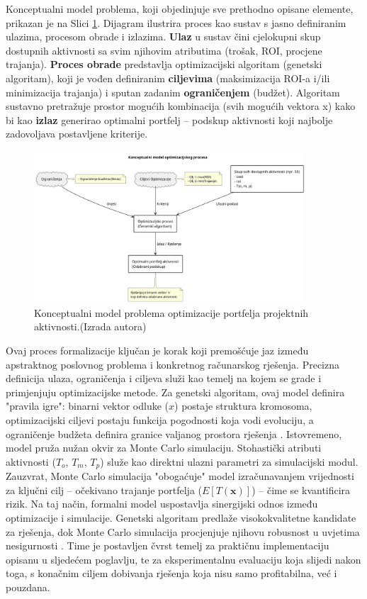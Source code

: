 Konceptualni model problema, koji objedinjuje sve prethodno opisane elemente, prikazan je na Slici \ref{fig:konceptualni_model}. Dijagram ilustrira proces kao sustav s jasno definiranim ulazima, procesom obrade i izlazima. \textbf{Ulaz} u sustav čini cjelokupni skup dostupnih aktivnosti sa svim njihovim atributima (trošak, ROI, procjene trajanja). \textbf{Proces obrade} predstavlja optimizacijski algoritam (genetski algoritam), koji je vođen definiranim \textbf{ciljevima} (maksimizacija ROI-a i/ili minimizacija trajanja) i sputan zadanim \textbf{ograničenjem} (budžet). Algoritam sustavno pretražuje prostor mogućih kombinacija (svih mogućih vektora x) kako bi kao \textbf{izlaz} generirao optimalni portfelj – podskup aktivnosti koji najbolje zadovoljava postavljene kriterije.
\begin{figure}[H]
    \centering
    \includegraphics[width=0.9\textwidth]{slike/model_problema.png}
    \caption{Konceptualni model problema optimizacije portfelja projektnih aktivnosti.(Izrada autora)}
    \label{fig:konceptualni_model}
\end{figure}
Ovaj proces formalizacije ključan je korak koji premošćuje jaz između apstraktnog poslovnog problema i konkretnog računarskog rješenja. Precizna definicija ulaza, ograničenja i ciljeva služi kao temelj na kojem se grade i primjenjuju optimizacijske metode. Za genetski algoritam, ovaj model definira "pravila igre": binarni vektor odluke ($x$) postaje struktura kromosoma, optimizacijski ciljevi postaju funkcija pogodnosti koja vodi evoluciju, a ograničenje budžeta definira granice valjanog prostora rješenja \cite{Mitchell1998}.
Istovremeno, model pruža nužan okvir za Monte Carlo simulaciju. Stohastički atributi aktivnosti ($T_o$, $T_m$, $T_p$) služe kao direktni ulazni parametri za simulacijski modul. Zauzvrat, Monte Carlo simulacija "obogaćuje" model izračunavanjem vrijednosti za ključni cilj – očekivano trajanje portfelja ($E[T(\mathbf{x})]$) – čime se kvantificira rizik.
Na taj način, formalni model uspostavlja sinergijski odnos između optimizacije i simulacije. Genetski algoritam predlaže visokokvalitetne kandidate za rješenja, dok Monte Carlo simulacija procjenjuje njihovu robusnost u uvjetima nesigurnosti \cite{Rubinstein2016}. Time je postavljen čvrst temelj za praktičnu implementaciju opisanu u sljedećem poglavlju, te za eksperimentalnu evaluaciju koja slijedi nakon toga, s konačnim ciljem dobivanja rješenja koja nisu samo profitabilna, već i pouzdana.
